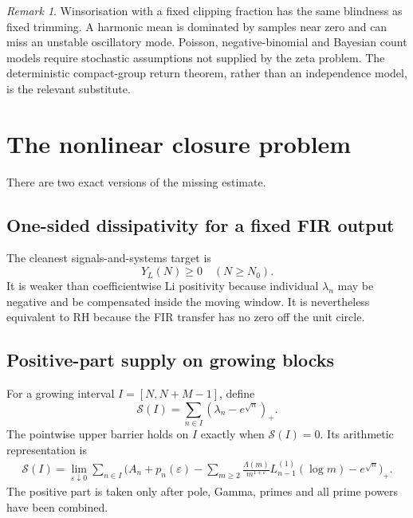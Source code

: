 \documentclass[11pt]{amsart}
\numberwithin{equation}{section}
\theoremstyle{definition}
\theoremstyle{remark}
\newtheorem{remark}[theorem]{Remark}
\newcommand{\eps}{\varepsilon}
\begin{document}
\begin{remark}
Winsorisation with a fixed clipping fraction has the same blindness as
fixed trimming. A harmonic mean is dominated by samples near zero and can
miss an unstable oscillatory mode. Poisson, negative-binomial and Bayesian
count models require stochastic assumptions not supplied by the zeta
problem. The deterministic compact-group return theorem, rather than an
independence model, is the relevant substitute.
\end{remark}

\section{The nonlinear closure problem}

There are two exact versions of the missing estimate.

\subsection{One-sided dissipativity for a fixed FIR output}

The cleanest signals-and-systems target is
\begin{equation}
 Y_L(N)\ge0\quad(N\ge N_0).                              \label{eq:9.1}
\end{equation}
It is weaker than coefficientwise Li positivity because individual
\(\lambda_n\) may be negative and be compensated inside the moving window.
It is nevertheless equivalent to RH because the FIR transfer has no zero
off the unit circle.

\subsection{Positive-part supply on growing blocks}

For a growing interval \(I=[N,N+M-1]\), define
\begin{equation}
 \mathcal S(I)=\sum_{n\in I}(\lambda_n-e^{\sqrt n})_+.
                                                        \label{eq:9.2}
\end{equation}
The pointwise upper barrier holds on \(I\) exactly when
\(\mathcal S(I)=0\). Its arithmetic representation is
\begin{equation}
\begin{aligned}
\mathcal S(I)
=\lim_{\eps\downarrow0}\sum_{n\in I}
\bigg(
 A_n+p_n(\eps)
 -\sum_{m\ge2}\frac{\Lambda(m)}{m^{1+\eps}}
       L_{n-1}^{(1)}(\log m)
 -e^{\sqrt n}
\bigg)_+ .
\end{aligned}                                            \label{eq:9.3}
\end{equation}
The positive part is taken only after pole, Gamma, primes and all prime
powers have been combined.
\end{document}
